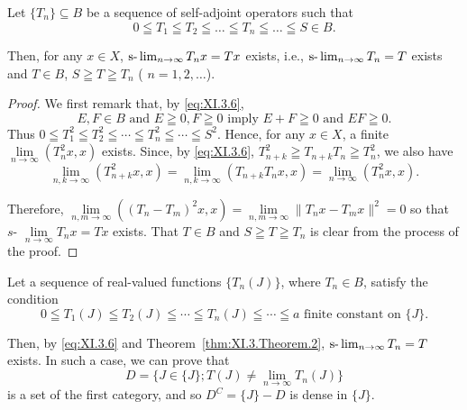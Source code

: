 \begin{theorem}\label{thm:XI.3.Theorem.2} Let $\{T_n\} \subseteq B$ be a sequence of self-adjoint operators such that 
\begin{equation}\label{eq:XI.3.9}
0 \leqq T _{1} \leqq T _{2} \leqq \dots \leqq T _{n} \leqq \dots \leqq S \in B.
\end{equation}
\end{theorem}

Then, for any $x \in X$, $\text{s-}\lim\nolimits_{n \to \infty} T_n x = Tx$ exists, i.e., $\text{s-}\lim\nolimits_{n \to \infty} T_n = T$ exists and $T \in B$, $S \geqq T \geqq T_n$ ( $n = 1, 2, \ldots$). 

\begin{proof}
 We first remark that, by \eqref{eq:XI.3.6}, 
\begin{equation}\label{eq:XI.3.10}
E, F \in B \text{ and } E \geqq 0, F \geqq 0 \text{ imply } E + F \geqq 0 \text{ and } EF \geqq 0.
\end{equation}
Thus $0 \leqq T_1^2 \leqq T_2^2 \leqq \cdots \leqq T_n^2 \leqq \cdots \leqq S^2$. Hence, for any $x \in X$, a finite $\lim\limits_{n \to \infty} (T_n^2 x, x)$ exists. Since, by \eqref{eq:XI.3.6}, $T_{n+k}^2 \geqq T_{n+k} T_n \geqq T_n^2$, we also have 
\[
\lim\limits _{n, k \rightarrow \infty} (T _{n+k} ^{2} x, x) = \lim\limits _{n, k \rightarrow \infty} (T _{n+k} T _{n} x, x) = \lim\limits _{n \rightarrow \infty} (T _{n} ^{2} x, x). \]

Therefore, $\lim\limits_{n,m\to \infty}((T_n - T_m)^2 x,x) = \lim\limits_{n,m\to \infty}\|T_nx - T_mx\|^2 = 0$ so that $s\text{- }\lim\limits_{n\to \infty}T_nx = Tx$ exists. That $T\in B$ and $S\geqq T\geqq T_n$ is clear from the process of the proof. 
\end{proof}

\begin{theorem}\label{thm:XI.3.Theorem.3} Let a sequence of real-valued functions $\{T_n(J)\}$, where $T_n \in B$, satisfy the condition 
\begin{equation}\label{eq:XI.3.11}
0 \leqq T_{1}(J) \leqq T_{2}(J) \leqq \cdots \leqq T_{n}(J) \leqq \cdots \leqq a \text{ finite constant on } \{J\}.
\end{equation}
\end{theorem}

Then, by \eqref{eq:XI.3.6} and Theorem~\ref{thm:XI.3.Theorem.2}, $\text{s-}\lim\nolimits_{n \to \infty} T_n = T$ exists. In such a case, we can prove that 
\[
D = \{J \in \{J \}; T (J) \neq \lim\limits _{n \rightarrow \infty} T _{n} (J) \}
\]
is a set of the first category, and so $D^{C} = \{J\} - D$ is dense in $\{J\}$. 

